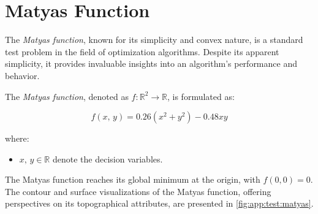 \section{Matyas Function}
\label{sec:app:test:matyas}
  The \emph{Matyas function}, known for its simplicity and convex nature, is a 
  standard test problem in the field of optimization algorithms.
  Despite its apparent simplicity, it provides invaluable insights into an
  algorithm's performance and behavior.

  \begin{definition}
    \label{def:app:test:matyas}
    The \emph{Matyas function}, denoted as \(f: \mathbb{R}^2 \rightarrow 
    \mathbb{R}\), is formulated as:

    \begin{equation}
      \label{eq:app:test:matyas}
      f(x,\, y) = 0.26(x^2 + y^2) - 0.48xy
    \end{equation}
    
    where:
    
    \begin{itemize}
      \item \(x,\, y \in \mathbb{R}\) denote the decision variables.
    \end{itemize}
  \end{definition}

  The Matyas function reaches its global minimum at the origin, with \(f(0, 0) =
  0\).
  The contour and surface visualizations of the Matyas function, offering
  perspectives on its topographical attributes, are presented in 
  \vref{fig:app:test:matyas}.

